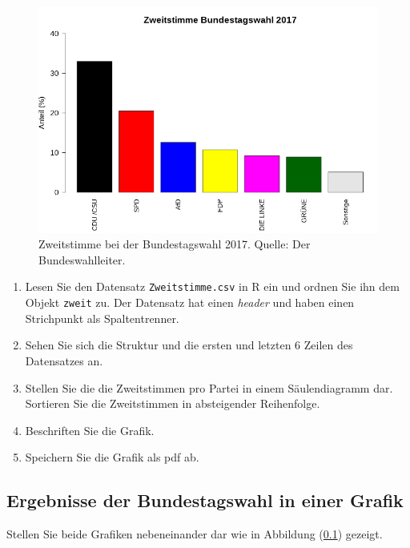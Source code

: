 \documentclass[]{book}
\providecommand{\tightlist}{%
  \setlength{\itemsep}{0pt}\setlength{\parskip}{0pt}}
\begin{document}
\begin{figure}
\includegraphics[width=1\linewidth]{Zweitstimme} \caption{Zweitstimme bei der Bundestagswahl 2017. Quelle: Der Bundeswahlleiter.}\label{fig:zweitstimme}
\end{figure}

\begin{enumerate}
\def\labelenumi{\arabic{enumi}.}
\tightlist
\item
  Lesen Sie den Datensatz \texttt{Zweitstimme.csv} in R ein und ordnen Sie ihn dem Objekt \texttt{zweit} zu. Der Datensatz hat einen \emph{header} und haben einen Strichpunkt als Spaltentrenner.
\item
  Sehen Sie sich die Struktur und die ersten und letzten 6 Zeilen des Datensatzes an.
\item
  Stellen Sie die die Zweitstimmen pro Partei in einem Säulendiagramm dar. Sortieren Sie die Zweitstimmen in absteigender Reihenfolge.
\item
  Beschriften Sie die Grafik.
\item
  Speichern Sie die Grafik als pdf ab.
\end{enumerate}

\hypertarget{zweigrafiken}{%
\subsection{Ergebnisse der Bundestagswahl in einer Grafik}\label{zweigrafiken}}

Stellen Sie beide Grafiken nebeneinander dar wie in Abbildung (\ref{zweigrafiken}) gezeigt.
\end{document}
